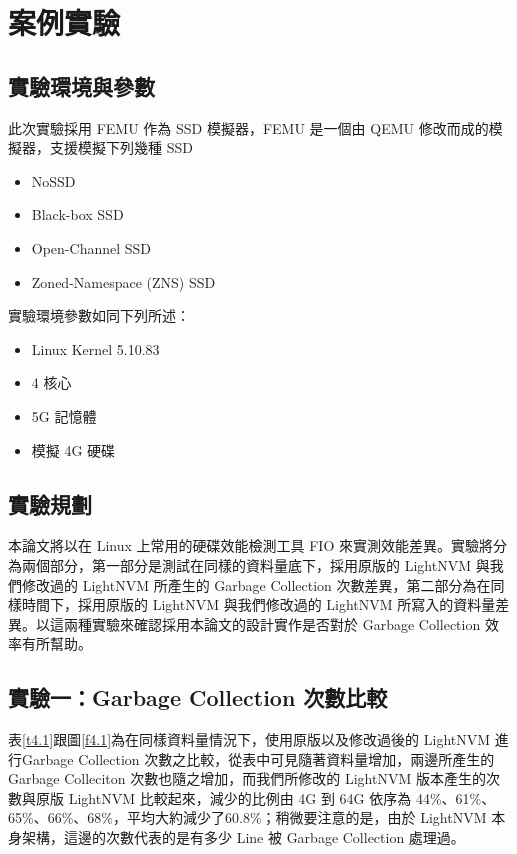 \chapter{案例實驗}
\section{實驗環境與參數}
此次實驗採用 FEMU 作為 SSD 模擬器，FEMU 是一個由 QEMU 修改而成的模擬器\cite{210518}，支援模擬下列幾種 SSD
\begin{itemize}
    \item NoSSD
    \item Black-box SSD
    \item Open-Channel SSD
    \item Zoned-Namespace (ZNS) SSD
\end{itemize}
實驗環境參數如同下列所述：
\begin{itemize}
    \item Linux Kernel 5.10.83
    \item 4 核心
    \item 5G 記憶體
    \item 模擬 4G 硬碟
\end{itemize}

\section{實驗規劃}
\indent
本論文將以在 Linux 上常用的硬碟效能檢測工具 FIO 來實測效能差異。實驗將分為兩個部分，第一部分是測試在同樣的資料量底下，採用原版的 LightNVM 與我們修改過的 LightNVM 所產生的 Garbage Collection 次數差異，第二部分為在同樣時間下，採用原版的 LightNVM 與我們修改過的 LightNVM 所寫入的資料量差異。以這兩種實驗來確認採用本論文的設計實作是否對於 Garbage Collection 效率有所幫助。

\section{實驗一：Garbage Collection 次數比較}\label{s4.2}

\indent
表\ref{t4.1}跟圖\ref{f4.1}為在同樣資料量情況下，使用原版以及修改過後的 LightNVM 進行Garbage Collection 次數之比較，從表中可見隨著資料量增加，兩邊所產生的 Garbage Colleciton 次數也隨之增加，而我們所修改的 LightNVM 版本產生的次數與原版 LightNVM 比較起來，減少的比例由 4G 到 64G 依序為 44\%、61\%、65\%、66\%、68\%，平均大約減少了60.8\%；稍微要注意的是，由於 LightNVM 本身架構，這邊的次數代表的是有多少 Line 被 Garbage Collection 處理過。

